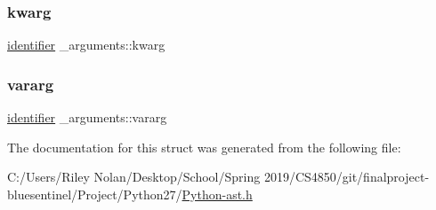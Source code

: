 \mbox{\label{struct__arguments_adaf47d76b5e7fd83511eceee4768b411}} 
\subsubsection{\texorpdfstring{kwarg}{kwarg}}
{\footnotesize\ttfamily \mbox{\hyperlink{asdl_8h_a78ca2081e230a95abc88c411c9816775}{identifier}} \+\_\+arguments\+::kwarg}

\mbox{\label{struct__arguments_a170875f77861eaf53e52cfe0c418ec16}} 
\subsubsection{\texorpdfstring{vararg}{vararg}}
{\footnotesize\ttfamily \mbox{\hyperlink{asdl_8h_a78ca2081e230a95abc88c411c9816775}{identifier}} \+\_\+arguments\+::vararg}



The documentation for this struct was generated from the following file\+:\begin{DoxyCompactItemize}
\item 
C\+:/\+Users/\+Riley Nolan/\+Desktop/\+School/\+Spring 2019/\+C\+S4850/git/finalproject-\/bluesentinel/\+Project/\+Python27/\mbox{\hyperlink{_python-ast_8h}{Python-\/ast.\+h}}\end{DoxyCompactItemize}
